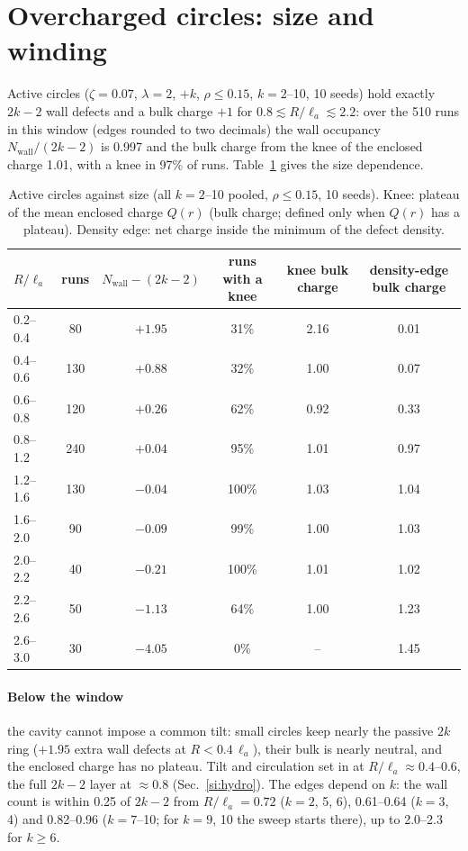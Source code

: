 \documentclass[aps,prl,onecolumn,superscriptaddress,amsmath,amssymb,nofootinbib]{revtex4-2}
\newcommand{\la}{\ell_a}
\begin{document}
\section{Overcharged circles: size and winding}\label{si:circles}
Active circles ($\zeta=0.07$, $\lambda=2$, $+k$, $\rho\le0.15$, $k=2$--10, 10 seeds) hold exactly $2k-2$ wall defects and a bulk charge $+1$ for
$0.8\lesssim R/\la\lesssim2.2$: over the 510 runs in this window (edges rounded to two decimals) the wall occupancy $N_\mathrm{wall}/(2k-2)$ is 0.997 and the bulk
charge from the knee of the enclosed charge 1.01, with a knee in 97\% of runs. Table~\ref{tab:s_circles} gives the size dependence.
\begin{table}[h]\centering\small
\caption{Active circles against size (all $k=2$--10 pooled, $\rho\le0.15$, 10 seeds). Knee: plateau of the mean enclosed charge $Q(r)$ (bulk charge; defined
only when $Q(r)$ has a plateau). Density edge: net charge inside the minimum of the defect density.}\label{tab:s_circles}
\begin{tabular}{lccccc}\hline
$R/\la$ & runs & $N_\mathrm{wall}-(2k-2)$ & runs with a knee & knee bulk charge & density-edge bulk charge\\\hline
0.2--0.4 & 80 & $+1.95$ & 31\% & 2.16 & 0.01\\
0.4--0.6 & 130 & $+0.88$ & 32\% & 1.00 & 0.07\\
0.6--0.8 & 120 & $+0.26$ & 62\% & 0.92 & 0.33\\
0.8--1.2 & 240 & $+0.04$ & 95\% & 1.01 & 0.97\\
1.2--1.6 & 130 & $-0.04$ & 100\% & 1.03 & 1.04\\
1.6--2.0 & 90 & $-0.09$ & 99\% & 1.00 & 1.03\\
2.0--2.2 & 40 & $-0.21$ & 100\% & 1.01 & 1.02\\
2.2--2.6 & 50 & $-1.13$ & 64\% & 1.00 & 1.23\\
2.6--3.0 & 30 & $-4.05$ & 0\% & -- & 1.45\\\hline
\end{tabular}\end{table}
\paragraph{Below the window} the cavity cannot impose a common tilt: small circles keep nearly the passive $2k$ ring ($+1.95$ extra wall defects at
$R<0.4\,\la$), their bulk is nearly neutral, and the enclosed charge has no plateau. Tilt and circulation set in at $R/\la\approx0.4$--0.6, the full
$2k-2$ layer at $\approx0.8$ (Sec.~\ref{si:hydro}). The edges depend on $k$: the wall count is within 0.25 of $2k-2$ from $R/\la=0.72$ ($k=2$, 5, 6), 0.61--0.64
($k=3$, 4) and 0.82--0.96 ($k=7$--10; for $k=9$, 10 the sweep starts there), up to 2.0--2.3 for $k\ge6$.
\end{document}
